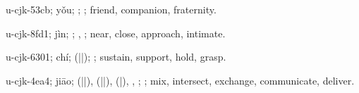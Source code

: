 \begin{multicols}{2}
{\cjkgGlue{}u-cjk-53cb; yǒu; \cjkgGlue{}; \cjkgGlue{}; friend, companion, fraternity.

\cjkgGlue{}u-cjk-8fd1; jìn; \cjkgGlue{}\cjkgGlue{}\cjkgGlue{}; \cjkgGlue{}, \cjkgGlue{}; near, close, approach, intimate.

\cjkgGlue{}u-cjk-6301; chí; \cjkgGlue{}\cjkgGlue{}(\cjkgGlue{}|\cjkgGlue{}|\cjkgGlue{}); \cjkgGlue{}; sustain, support, hold, grasp.

\cjkgGlue{}u-cjk-4ea4; jiāo; \cjkgGlue{}\cjkgGlue{}(\cjkgGlue{}|\cjkgGlue{}|\cjkgGlue{}), \cjkgGlue{}\cjkgGlue{}(\cjkgGlue{}|\cjkgGlue{}|\cjkgGlue{}), \cjkgGlue{}\cjkgGlue{}(\cjkgGlue{}|\cjkgGlue{}), \cjkgGlue{}\cjkgGlue{}\cjkgGlue{}, \cjkgGlue{}; \cjkgGlue{}; mix, intersect, exchange, communicate, deliver.

}
\end{multicols}
